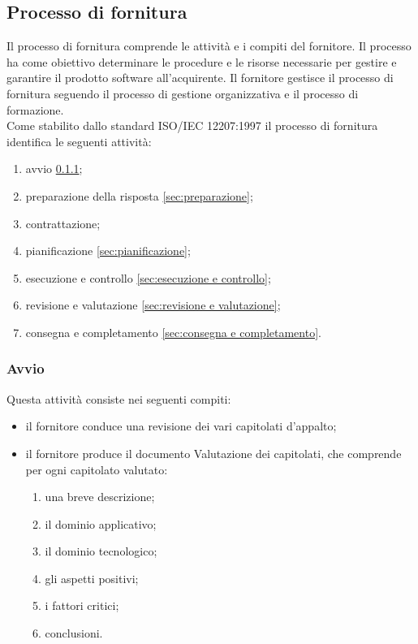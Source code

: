 \subsection{Processo di fornitura}\label{sec:supplyP}
Il processo di fornitura comprende le attività e i compiti del fornitore. Il processo ha come obiettivo determinare le procedure e le risorse necessarie per gestire e garantire il prodotto software all'acquirente.
Il fornitore gestisce il processo di fornitura seguendo il processo di gestione organizzativa e il processo di formazione. \\
    Come stabilito dallo standard ISO/IEC 12207:1997 \cite{bib:ISO12207_1997} il processo di fornitura identifica le seguenti attività:
    \begin{enumerate}
        \item avvio \ref{sec:avvio};
        \item preparazione della risposta \ref{sec:preparazione};
        \item contrattazione;
        \item pianificazione \ref{sec:pianificazione};
        \item esecuzione e controllo \ref{sec:esecuzione e controllo};
        \item revisione e valutazione \ref{sec:revisione e valutazione};
        \item consegna e completamento \ref{sec:consegna e completamento}.
    \end{enumerate}

    \subsubsection{Avvio}\label{sec:avvio}
        Questa attività consiste nei seguenti compiti:
        \begin{itemize}
            \item il fornitore conduce una revisione dei vari capitolati d'appalto;
            \item il fornitore produce il documento Valutazione dei capitolati, che comprende per ogni capitolato valutato:
            \begin{enumerate}
                \item una breve descrizione;
                \item il dominio applicativo;
                \item il dominio tecnologico;
                \item gli aspetti positivi;
                \item i fattori critici;
                \item conclusioni.
            \end{enumerate}
        \end{itemize}

